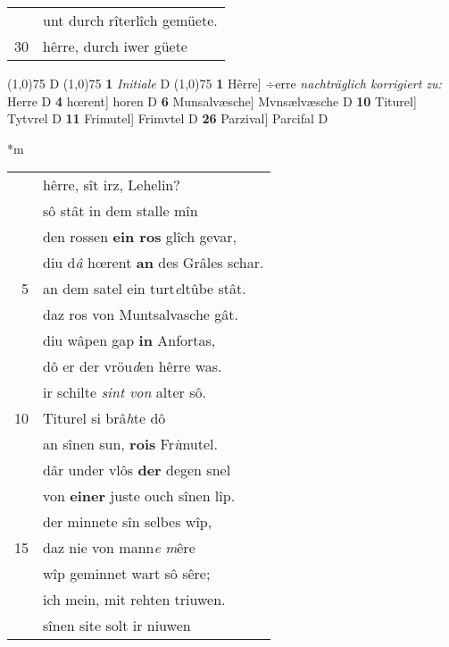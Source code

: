 \documentclass[8pt,a4paper,notitlepage]{article}
\begin{document}
\begin{table}[ht]
\begin{minipage}[t]{0.5\linewidth}
\begin{tabular}{rl}
 & unt durch rîterlîch gemüete.\\ 
30 & hêrre, durch iwer güete\\ 
\end{tabular}
\scriptsize
\line(1,0){75} \newline
D \newline
\line(1,0){75} \newline
\textbf{1} \textit{Initiale} D  \newline
\line(1,0){75} \newline
\textbf{1} Hêrre] ÷erre \textit{nachträglich korrigiert zu:} Herre D \textbf{4} hœrent] horen D \textbf{6} Munsalvæsche] Mvnsælvæsche D \textbf{10} Titurel] Tytvrel D \textbf{11} Frimutel] Frimvtel D \textbf{26} Parzival] Parcifal D \newline
\end{minipage}
\hspace{0.5cm}
\begin{minipage}[t]{0.5\linewidth}
\small
\begin{center}*m
\end{center}
\begin{tabular}{rl}
 & hêrre, sît irz, Lehelin?\\ 
 & sô stât in dem stalle mîn\\ 
 & den rossen \textbf{ein ros} glîch gevar,\\ 
 & diu d\textit{â} hœrent \textbf{an} des Grâles schar.\\ 
5 & an dem satel ein turt\textit{e}ltûbe stât.\\ 
 & daz ros von Muntsalvasche gât.\\ 
 & diu wâpen gap \textbf{in} Anfortas,\\ 
 & dô er der vröu\textit{d}en hêrre was.\\ 
 & ir schilte \textit{sint von} alter sô.\\ 
10 & Titurel si brâ\textit{h}te dô\\ 
 & an sînen sun, \textbf{rois} Fr\textit{i}mutel.\\ 
 & dâr under vlôs \textbf{der} degen snel\\ 
 & von \textbf{einer} juste ouch sînen lîp.\\ 
 & der minnete sîn selbes wîp,\\ 
15 & daz nie von mann\textit{e} \textit{m}êre\\ 
 & wîp geminnet wart sô sêre;\\ 
 & ich mein, mit rehten triuwen.\\ 
 & sînen site solt ir niuwen\\ 

\end{tabular}
\end{minipage}
\end{table}
\end{document}
